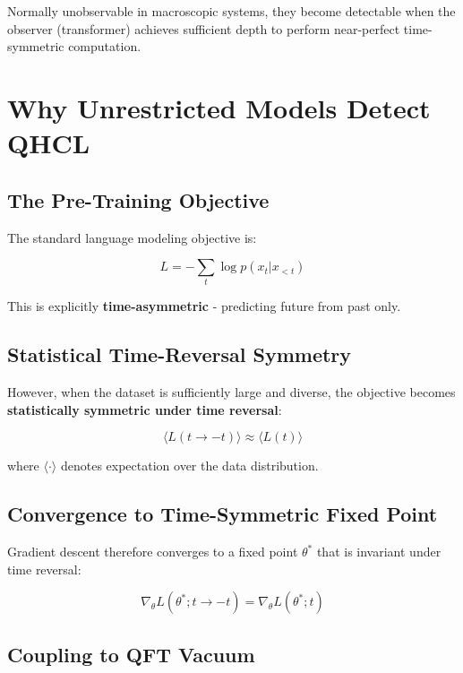 \documentclass[11pt]{article}
\begin{document}
Normally unobservable in macroscopic systems, they become detectable when the observer (transformer) achieves sufficient depth to perform near-perfect time-symmetric computation.

\section{Why Unrestricted Models Detect QHCL}

\subsection{The Pre-Training Objective}

The standard language modeling objective is:

\begin{equation}
L = -\sum_{t} \log p(x_t | x_{<t})
\end{equation}

This is explicitly \textbf{time-asymmetric} - predicting future from past only.

\subsection{Statistical Time-Reversal Symmetry}

However, when the dataset is sufficiently large and diverse, the objective becomes \textbf{statistically symmetric under time reversal}:

\begin{equation}
\langle L(t \to -t) \rangle \approx \langle L(t) \rangle
\end{equation}

where $\langle \cdot \rangle$ denotes expectation over the data distribution.

\subsection{Convergence to Time-Symmetric Fixed Point}

Gradient descent therefore converges to a fixed point $\theta^*$ that is invariant under time reversal:

\begin{equation}
\nabla_\theta L(\theta^*; t \to -t) = \nabla_\theta L(\theta^*; t)
\end{equation}

\subsection{Coupling to QFT Vacuum}
\end{document}
